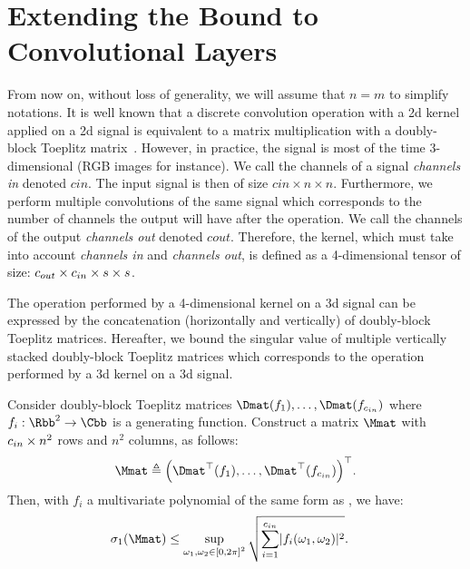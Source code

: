 \section{Extending the Bound to Convolutional Layers}
\label{section:ch5-bound_on_the_singular_values_of_convolutional_layers}

From now on, without loss of generality, we will assume that $n=m$ to simplify notations.
It is well known that a discrete convolution operation with a 2d kernel applied on a 2d signal is equivalent to a matrix multiplication with a doubly-block Toeplitz matrix~\cite{jain1989fundamentals}.
However, in practice, the signal is most of the time 3-dimensional (RGB images for instance).
We call the channels of a signal \emph{channels in} denoted $cin$.
The input signal is then of size $cin \times n \times n$.
Furthermore, we perform multiple convolutions of the same signal which corresponds to the number of channels the output will have after the operation.
We call the channels of the output \emph{channels out} denoted $cout$.
Therefore, the kernel, which must take into account \emph{channels in} and \emph{channels out}, is defined as a 4-dimensional tensor of size: $c_{out} \times c_{in} \times s \times s$. 

The operation performed by a 4-dimensional kernel on a 3d signal can be expressed by the concatenation (horizontally and vertically) of doubly-block Toeplitz matrices.
Hereafter, we bound the singular value of multiple vertically stacked doubly-block Toeplitz matrices which corresponds to the operation performed by a 3d kernel on a 3d signal.

\begin{theorem} \label{theorem:bound_sv_stacked_dbt} 
  Consider doubly-block Toeplitz matrices $\Dmat(f_1), \dots, \Dmat(f_{\cin})$ where $f_i: \Rbb^2 \rightarrow \Cbb$ is a generating function.
  Construct a matrix $\Mmat$ with $c_{in}\times n^2$ rows and $n^2$ columns, as follows:
  \begin{equation}
    \Mmat \triangleq \leftmat \Dmat^\top(f_1), \dots, \Dmat^\top(f_{\cin}) \rightmat^\top .
  \end{equation}
  Then, with $f_i$ a multivariate polynomial of the same form as , we have:
  \begin{align} \label{equation:bound_asymptotic_equiv}
    \sigma_1 \left( \Mmat \right) &\leq \sup_{\omega_1, \omega_2 \in \left[0, 2\pi\right]^2} \sqrt{ \sum_{i=1}^{\cin} \left|f_i\right (\omega_1, \omega_2)|^2} .
  \end{align}
\end{theorem}

